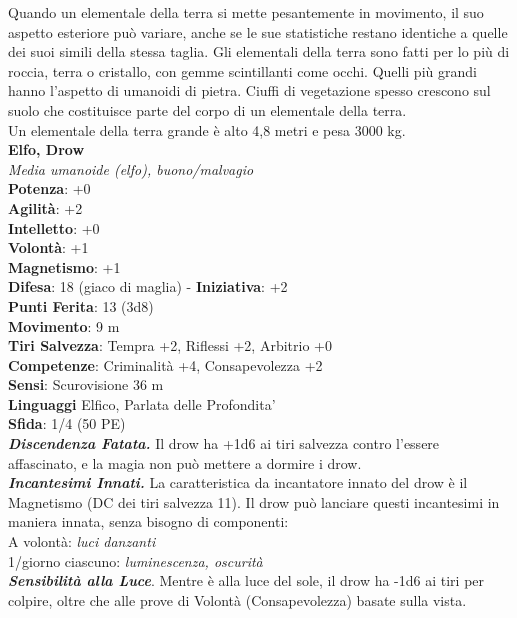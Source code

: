\begin{multicols}{2}
Quando un elementale della terra si mette pesantemente in movimento, il suo aspetto esteriore può variare, anche se le sue statistiche restano identiche a quelle dei suoi simili della stessa taglia. Gli elementali della terra sono fatti per lo più di roccia, terra o cristallo, con gemme scintillanti come occhi. Quelli più grandi hanno l’aspetto di umanoidi di pietra. Ciuffi di vegetazione spesso crescono sul suolo che costituisce parte del corpo di un elementale della terra.\\

Un elementale della terra grande è alto 4,8 metri e pesa 3000 kg.\\

\medskip\textbf{Elfo, Drow}\\
\emph{Media umanoide (elfo), buono/malvagio}\\
\textbf{Potenza}: +0\\
\textbf{Agilità}: +2\\
\textbf{Intelletto}: +0\\
\textbf{Volontà}: +1\\
\textbf{Magnetismo}: +1\\
\textbf{Difesa}: 18 (giaco di maglia) - \textbf{Iniziativa}: +2\\
\textbf{Punti Ferita}: 13 (3d8)\\
\textbf{Movimento}: 9 m\\
\textbf{Tiri Salvezza}: Tempra +2, Riflessi +2, Arbitrio +0\\
\textbf{Competenze}: Criminalità +4, Consapevolezza +2\\
\textbf{Sensi}: Scurovisione 36 m\\
\textbf{Linguaggi} Elfico, Parlata delle Profondita'\\
\textbf{Sfida}: 1/4 (50 PE)\smallskip\\
\emph{\textbf{Discendenza Fatata.}} Il drow ha +1d6 ai tiri salvezza contro l'essere affascinato, e la magia non può mettere a dormire i drow.\\
\emph{\textbf{Incantesimi Innati.}} La caratteristica da incantatore innato del drow è il Magnetismo (DC dei tiri salvezza 11). Il drow può lanciare questi incantesimi in maniera innata, senza bisogno di componenti:\\
A volontà: \emph{luci danzanti}\\
1/giorno ciascuno: \emph{luminescenza, oscurità}\\
\emph{\textbf{Sensibilità alla Luce}}. Mentre è alla luce del sole, il drow ha -1d6 ai tiri per colpire, oltre che alle prove di Volontà (Consapevolezza) basate sulla vista.\\

\end{multicols}
